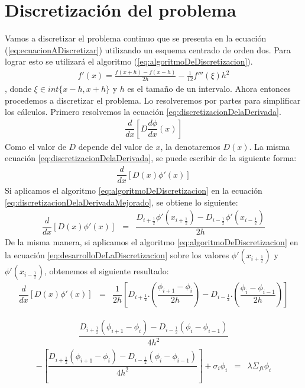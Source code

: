 \documentclass[11pt,a4paper]{emulateapj}
\begin{document}
\section{Discretización del problema}
\label{sec:discretizacion}
Vamos a discretizar el problema continuo que se presenta en la ecuación (\ref{eq:ecuacionADiscretizar}) 
utilizando un esquema centrado de orden dos. Para lograr esto se utilizará el algoritmo (\ref{eq:algoritmoDeDiscretizacion}).
\begin{eqnarray}
\label{eq:algoritmoDeDiscretizacion}
	f'(x) = \frac{f(x+h) - f(x-h)}{2h} - \frac{1}{12} f'''(\xi) h^2
\end{eqnarray}
, donde $\xi \in int\{x-h,x+h\}$ y $h$ es el tamaño de un intervalo.
Ahora entonces procedemos a discretizar el problema. Lo resolveremos por partes para simplificar los cálculos. Primero resolvemos la ecuación \ref{eq:discretizacionDelaDerivada}.
\begin{eqnarray}
\label{eq:discretizacionDelaDerivada}
	\dfrac{d}{dx}[D \dfrac{d\phi}{dx}(x)]  
\end{eqnarray}
Como el valor de $D$ depende del valor de $x$, la denotaremos $D(x)$. La misma ecuación \ref{eq:discretizacionDelaDerivada}, se puede escribir de la siguiente forma:
\begin{eqnarray}
\label{eq:discretizacionDelaDerivadaMejorado}
	\dfrac{d}{dx}[D(x) \phi'(x)]
\end{eqnarray}
Si aplicamos el algoritmo \ref{eq:algoritmoDeDiscretizacion} en la ecuación \ref{eq:discretizacionDelaDerivadaMejorado}, se obtiene lo siguiente:
\begin{eqnarray}
\label{eq:desarrolloDeLaDiscretizacion}
	\dfrac{d}{dx}[D(x) \phi'(x)] &=& \dfrac{D_{i+\frac{1}{2}}\phi'(x_{i+\frac{1}{2}})  -  D_{i-\frac{1}{2}}\phi'(x_{i-\frac{1}{2}})}     {2h} 
\end{eqnarray}
De la misma manera, si aplicamos el algoritmo \ref{eq:algoritmoDeDiscretizacion} en la ecuación \ref{eq:desarrolloDeLaDiscretizacion} sobre los valores $\phi'(x_{i+\frac{1}{2}})$ y $\phi'(x_{i-\frac{1}{2}})$, obtenemos el siguiente resultado:
\begin{eqnarray}
\label{eq:desarrolloDeLaDiscretizacion2}
	\dfrac{d}{dx}[D(x) \phi'(x)] &=& \dfrac{1}{2h} [	D_{i+\frac{1}{2}}.(\dfrac{\phi_{i+1} - \phi_{i}}{2h}) 	-
			D_{i-\frac{1}{2}}.(\dfrac{\phi_{i} - \phi_{i-1}}{2h})]	
\end{eqnarray}


\begin{eqnarray}
	\dfrac{D_{i+\frac{1}{2}}(\phi_{i+1} - \phi_{i}) - D_{i-\frac{1}{2}}(\phi_{i} - \phi_{i-1})}{4h^2}
\end{eqnarray}
\begin{eqnarray}
	-[\dfrac{D_{i+\frac{1}{2}}(\phi_{i+1} - \phi_{i}) - D_{i-\frac{1}{2}}(\phi_{i} - \phi_{i-1})}{4h^2}]
	+ \sigma_i \phi_i &=& \lambda \Sigma_{fi} \phi_i
\end{eqnarray}
\end{document}
